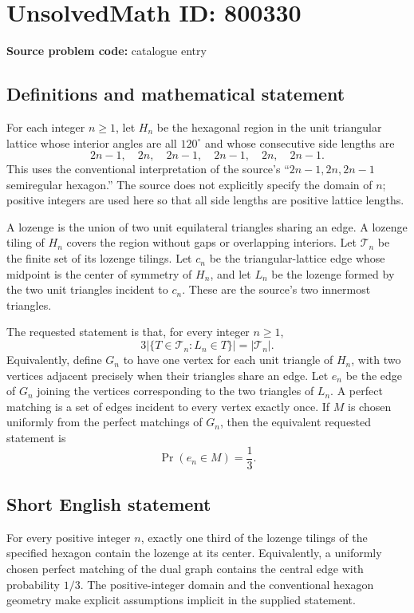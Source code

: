 \documentclass[11pt]{article}
\begin{document}
\section*{UnsolvedMath ID: 800330}
\textbf{Source problem code:} catalogue entry
\subsection{Definitions and mathematical statement}
For each integer \(n\geq 1\), let \(H_n\) be the hexagonal region in the unit triangular lattice whose interior angles are all \(120^\circ\) and whose consecutive side lengths are
\[
2n-1,\quad 2n,\quad 2n-1,\quad 2n-1,\quad 2n,\quad 2n-1.
\]
This uses the conventional interpretation of the source's ``\(2n-1,2n,2n-1\) semiregular hexagon.'' The source does not explicitly specify the domain of \(n\); positive integers are used here so that all side lengths are positive lattice lengths.

A lozenge is the union of two unit equilateral triangles sharing an edge. A lozenge tiling of \(H_n\) covers the region without gaps or overlapping interiors. Let \(\mathcal T_n\) be the finite set of its lozenge tilings. Let \(c_n\) be the triangular-lattice edge whose midpoint is the center of symmetry of \(H_n\), and let \(L_n\) be the lozenge formed by the two unit triangles incident to \(c_n\). These are the source's two innermost triangles.

The requested statement is that, for every integer \(n\geq 1\),
\[
3\bigl|\{T\in\mathcal T_n:L_n\in T\}\bigr|=|\mathcal T_n|.
\]
Equivalently, define \(G_n\) to have one vertex for each unit triangle of \(H_n\), with two vertices adjacent precisely when their triangles share an edge. Let \(e_n\) be the edge of \(G_n\) joining the vertices corresponding to the two triangles of \(L_n\). A perfect matching is a set of edges incident to every vertex exactly once. If \(M\) is chosen uniformly from the perfect matchings of \(G_n\), then the equivalent requested statement is
\[
\Pr(e_n\in M)=\frac13.
\]
\subsection{Short English statement}
For every positive integer \(n\), exactly one third of the lozenge tilings of the specified hexagon contain the lozenge at its center. Equivalently, a uniformly chosen perfect matching of the dual graph contains the central edge with probability \(1/3\). The positive-integer domain and the conventional hexagon geometry make explicit assumptions implicit in the supplied statement.
\end{document}
